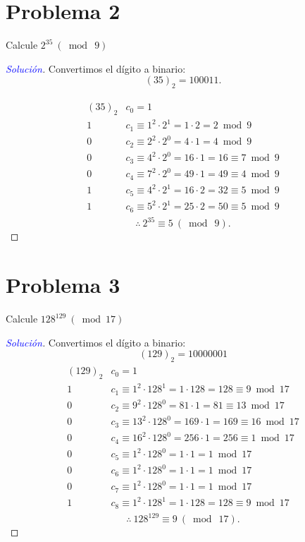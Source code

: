\documentclass[a4paper,12pt]{article}
\newenvironment{solution}
  {\renewcommand\qedsymbol{$\square$}\begin{proof}[\textcolor{blue}{Solución}]}
  {\end{proof}}
\begin{document}
\section{Problema 2}
Calcule $2^{35}\ (\bmod\ 9)$
\begin{solution}
	Convertimos el dígito a binario: 
	$$(35)_2=100011.$$

	\begin{align*}
		\begin{array}{l|l}
			(35)_{2} & c_{0}=1 \\
			\hline 1 & c_{1} \equiv 1^{2} \cdot 2^{1}=1 \cdot 2=2 \bmod 9 \\
			\hline 0 & c_{2} \equiv 2^{2} \cdot 2^{0}=4 \cdot 1=4 \bmod 9 \\
			\hline 0 & c_{3} \equiv 4^{2} \cdot 2^{0}=16 \cdot 1=16 \equiv 7 \bmod 9 \\
			\hline 0 & c_{4} \equiv 7^{2} \cdot 2^{0}=49 \cdot 1=49 \equiv 4 \bmod 9 \\
			\hline 1 & c_{5} \equiv 4^{2} \cdot 2^{1}=16 \cdot 2=32 \equiv 5 \bmod 9 \\
			\hline 1 & c_{6} \equiv 5^{2} \cdot 2^{1}=25 \cdot 2=50 \equiv 5 \bmod 9
		\end{array}
	\end{align*}
	$$\therefore \ 2^{35}\equiv 5 \ (\bmod\ 9).$$
\end{solution}
\section{Problema 3}
Calcule $128^{129} \ (\bmod 17)$
\begin{solution}
	Convertimos el dígito a binario: 
	$$(129)_2=10000001$$
	\begin{align*}
			\begin{array}{l|l}
				(129)_{2} & c_{0}=1 \\
				\hline 1 & c_{1} \equiv 1^{2} \cdot 128^{1}=1 \cdot 128=128 \equiv 9 \bmod 17 \\
				\hline 0 & c_{2} \equiv 9^{2} \cdot 128^{0}=81 \cdot 1=81 \equiv 13 \bmod 17 \\
				\hline 0 & c_{3} \equiv 13^{2} \cdot 128^{0}=169 \cdot 1=169 \equiv 16 \bmod 17 \\
				\hline 0 & c_{4} \equiv 16^{2} \cdot 128^{0}=256 \cdot 1=256 \equiv 1 \bmod 17 \\
				\hline 0 & c_{5} \equiv 1^{2} \cdot 128^{0}=1 \cdot 1=1 \bmod 17 \\
				\hline 0 & c_{6} \equiv 1^{2} \cdot 128^{0}=1 \cdot 1=1 \bmod 17 \\
				\hline 0 & c_{7} \equiv 1^{2} \cdot 128^{0}=1 \cdot 1=1 \bmod 17 \\
				\hline 1 & c_{8} \equiv 1^{2} \cdot 128^{1}=1 \cdot 128=128 \equiv 9 \bmod 17
			\end{array}
	\end{align*}
	$$\therefore \ 128^{129} \equiv 9 \ (\bmod \ 17).$$
\end{solution}
%
%
\end{document}
